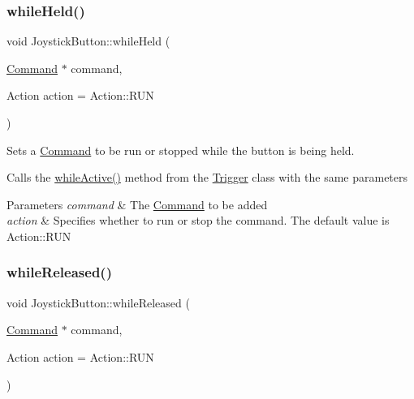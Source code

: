 \subsubsection{\texorpdfstring{whileHeld()}{whileHeld()}}
{\footnotesize\ttfamily void Joystick\+Button\+::while\+Held (\begin{DoxyParamCaption}\item[{\mbox{\hyperlink{classlib_iterative_robot_1_1_command}{Command}} $\ast$}]{command,  }\item[{Action}]{action = {\ttfamily Action\+:\+:RUN} }\end{DoxyParamCaption})}



Sets a \mbox{\hyperlink{classlib_iterative_robot_1_1_command}{Command}} to be run or stopped while the button is being held. 

Calls the \mbox{\hyperlink{classlib_iterative_robot_1_1_trigger_a66c9e7fe16d1907aed3f7b3c51bb8917}{while\+Active()}} method from the \mbox{\hyperlink{classlib_iterative_robot_1_1_trigger}{Trigger}} class with the same parameters


\begin{DoxyParams}{Parameters}
{\em command} & The \mbox{\hyperlink{classlib_iterative_robot_1_1_command}{Command}} to be added \\
\hline
{\em action} & Specifies whether to run or stop the command. The default value is Action\+::\+R\+UN \\
\hline
\end{DoxyParams}
\mbox{\label{classlib_iterative_robot_1_1_joystick_button_a6d781e460c7ee3325de48e7a5ade9ebd}} 
\subsubsection{\texorpdfstring{whileReleased()}{whileReleased()}}
{\footnotesize\ttfamily void Joystick\+Button\+::while\+Released (\begin{DoxyParamCaption}\item[{\mbox{\hyperlink{classlib_iterative_robot_1_1_command}{Command}} $\ast$}]{command,  }\item[{Action}]{action = {\ttfamily Action\+:\+:RUN} }\end{DoxyParamCaption})}



